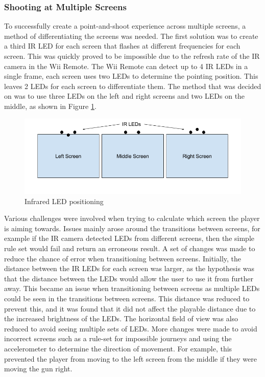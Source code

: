 \documentclass[a4paper,11pt]{article}
\begin{document}
\subsubsection{Shooting at Multiple Screens}
To successfully create a point-and-shoot experience across multiple screens, a method of differentiating the screens was needed. The first solution was to create a third IR LED for each screen that flashes at different frequencies for each screen. This was quickly proved to be impossible due to the refresh rate of the IR camera in the Wii Remote. The Wii Remote can detect up to 4 IR LEDs in a single frame, each screen uses two LEDs to determine the pointing position. This leaves 2 LEDs for each screen to differentiate them. The method that was decided on was to use three LEDs on the left and right screens and two LEDs on the middle, as shown in Figure \ref{fig:led_pos}. 

\begin{figure}
	\centering
	\includegraphics[scale=0.5]{led_pos}
    \caption{Infrared LED positioning}
    \label{fig:led_pos}
\end{figure}

Various challenges were involved when trying to calculate which screen the player is aiming towards. Issues mainly arose around the transitions between screens, for example if the IR camera detected LEDs from different screens, then the simple rule set would fail and return an erroneous result. A set of changes was made to reduce the chance of error when transitioning between screens. Initially, the distance between the IR LEDs for each screen was larger, as the hypothesis was that the distance between the LEDs would allow the user to use it from further away. This became an issue when transitioning between screens as multiple LEDs could be seen in the transitions between screens. This distance was reduced to prevent this, and it was found that it did not affect the playable distance due to the increased brightness of the LEDs. The horizontal field of view was also reduced to avoid seeing multiple sets of LEDs. More changes were made to avoid incorrect screens such as a rule-set for impossible journeys and using the accelerometer to determine the direction of movement. For example, this prevented the player from moving to the left screen from the middle if they were moving the gun right. 
\end{document}
